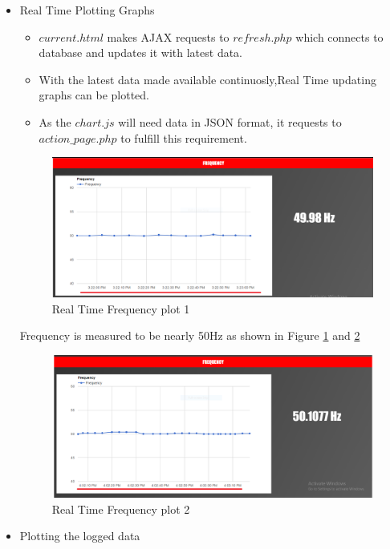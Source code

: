 \documentclass[a4paper,12pt,oneside]{book}
\begin{document}
\begin{itemize}
\begin{itemize}
\begin{itemize}
		\end{itemize}    
		\newpage	
	\end{itemize}
	\item{Real Time Plotting Graphs}
	\begin{itemize}
		\item{$current.html$ makes AJAX requests to $refresh.php$ which connects to database and updates it with latest data.}
		\item{With the latest data made available continuosly,Real Time updating graphs can be plotted.}
		\item{As the $chart.js$ will need data in JSON format, it requests to $action\_page.php$ to fulfill this requirement. }
	\end{itemize}
	\begin{figure}[H]
		\centering
		\includegraphics[width=15cm]{freq1.png} 
		\caption{Real Time Frequency plot 1 }
		\label{3}	
	\end{figure}
	Frequency is measured to be nearly 50Hz as shown in Figure \ref{3} and \ref{4} 
	\begin{figure}
		\centering
		\includegraphics[width=15cm]{freq_mov.png}
		\caption{Real Time Frequency plot 2 }	
		\label{4}
	\end{figure}
	\newpage
	\item{Plotting the logged data }
	\begin{itemize}	

\end{itemize}
\end{itemize}
\end{document}
